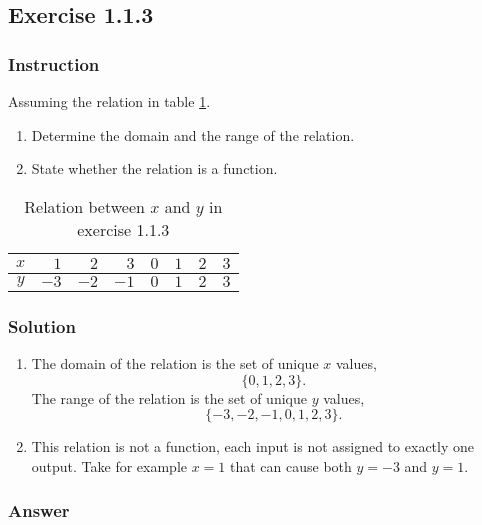 \documentclass[11pt, letterpaper, oneside]{memoir}
\begin{document}
\subsection*{Exercise 1.1.3}

\subsubsection{Instruction}

Assuming the relation in table \ref{table:exercise-1.1.3}.
\begin{enumerate}[label=(\alph*)]
  \item Determine the domain and the range of the relation.
  \item State whether the relation is a function.
\end{enumerate}

\begin{table}[ht]
  \centering
  \begin{tabular}{ c | r r r r r r r }
    \hline
    $ x $ & $ 1 $ & $ 2 $ & $ 3 $ & $ 0 $ & $ 1 $ & $ 2 $ & $ 3 $ \\
    \hline
    $ y $ & $ -3 $ & $ -2 $ & $ -1 $ & $ 0 $ & $ 1 $ & $ 2 $ & $ 3 $ \\
    \hline
  \end{tabular}
  \caption{Relation between $ x $ and $ y $ in exercise 1.1.3}
  \label{table:exercise-1.1.3}
\end{table}

\subsubsection{Solution}

\begin{enumerate}[label=(\alph*)]
  \item The domain of the relation is the set of unique $ x $ values,
    $$ \phantom{.}
    \{ 0, 1, 2, 3 \}
    .$$
    The range of the relation is the set of unique $ y $ values,
    $$ \phantom{.}
    \{ -3, -2, -1, 0, 1, 2, 3 \}
    .$$
  \item This relation is not a function, each input is not assigned to exactly one output. Take for example $ x = 1 $ that can cause both $ y = -3 $ and $ y = 1 $.
\end{enumerate}

\subsubsection{Answer}
\end{document}
